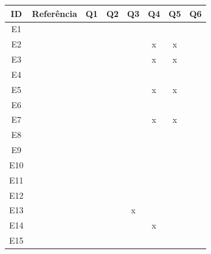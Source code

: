 \begin{table}[h!]
	\centering
	\label{tab:triagem}
	\begin{tabular}{|c|c|c|c|c|c|c|c|}
		\hline
		\textbf{ID} & \textbf{Referência} & \textbf{Q1} & \textbf{Q2} & \textbf{Q3} & \textbf{Q4} & \textbf{Q5} & \textbf{Q6} \\ \hline
		E1 & \cite{asbjornsen2022echange} & \checkmark & \checkmark & \checkmark & \checkmark & \checkmark & \checkmark \\ \hline
		E2 & \cite{dehmel2021weather} & \checkmark & \checkmark & \checkmark & x & x & \checkmark \\ \hline
		E3 & \cite{giraldo2024ecotourism} & \checkmark & \checkmark & \checkmark & x & x & \checkmark \\ \hline
		E4 & \cite{kumar2023rheumatology} & \checkmark & \checkmark & \checkmark & \checkmark & \checkmark & \checkmark \\ \hline
		E5 & \cite{lambe2022capabilities} & \checkmark & \checkmark & \checkmark & x & x & \checkmark \\ \hline
		E6 & \cite{lee2023industry} & \checkmark & \checkmark & \checkmark & \checkmark & \checkmark & \checkmark \\ \hline
		E7 & \cite{milton2021eatingdisorders} & \checkmark & \checkmark & \checkmark & x & x & \checkmark \\ \hline
		E8 & \cite{seko2024transitions} & \checkmark & \checkmark & \checkmark & \checkmark & \checkmark & \checkmark\\ \hline
		E9 & \cite{soto2023prototyping} & \checkmark & \checkmark & \checkmark & \checkmark & \checkmark & \checkmark\\ \hline
		E10 & \cite{villa2022integratedcare} & \checkmark & \checkmark & \checkmark & \checkmark & \checkmark & \checkmark \\ \hline
		E11 & \cite{wang2023smartproducts} & \checkmark & \checkmark & \checkmark & \checkmark & \checkmark & \checkmark \\ \hline
		E12 & \cite{yan2022pssvalue} & \checkmark & \checkmark & \checkmark & \checkmark & \checkmark & \checkmark\\ \hline
		E13 & \cite{Kim2024} & \checkmark & \checkmark & x & \checkmark & \checkmark & \checkmark\\ \hline
		E14 & \cite{Suryawati2024} & \checkmark & \checkmark & \checkmark & x & \checkmark & \checkmark\\ \hline
		E15 & \cite{hegemann2024palette} & \checkmark & \checkmark & \checkmark & \checkmark & \checkmark & \checkmark\\ \hline

\end{tabular}
\end{table}
